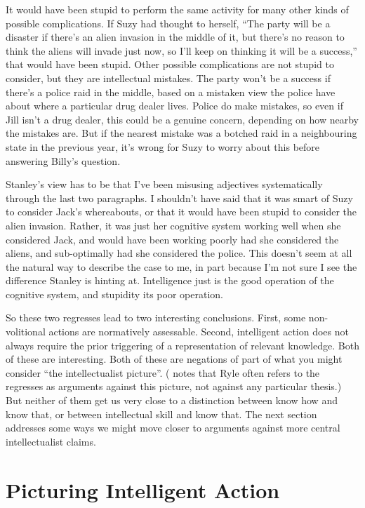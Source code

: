 It would have been stupid to perform the same activity for many other kinds of possible complications. If Suzy had thought to herself, ``The party will be a disaster if there's an alien invasion in the middle of it, but there's no reason to think the aliens will invade just now, so I'll keep on thinking it will be a success,'' that would have been stupid. Other possible complications are not stupid to consider, but they are intellectual mistakes. The party won't be a success if there's a police raid in the middle, based on a mistaken view the police have about where a particular drug dealer lives. Police do make mistakes, so even if Jill isn't a drug dealer, this could be a genuine concern, depending on how nearby the mistakes are. But if the nearest mistake was a botched raid in a neighbouring state in the previous year, it's wrong for Suzy to worry about this before answering Billy's question.

Stanley's view has to be that I've been misusing adjectives systematically through the last two paragraphs. I shouldn't have said that it was smart of Suzy to consider Jack's whereabouts, or that it would have been stupid to consider the alien invasion. Rather, it was just her cognitive system working well when she considered Jack, and would have been working poorly had she considered the aliens, and sub-optimally had she considered the police. This doesn't seem at all the natural way to describe the case to me, in part because I'm not sure I see the difference Stanley is hinting at. Intelligence just is the good operation of the cognitive system, and stupidity its poor operation.

So these two regresses lead to two interesting conclusions. First, some non-volition\-al actions are normatively assessable. Second, intelligent action does not always require the prior triggering of a representation of relevant knowledge. Both of these are interesting. Both of these are negations of part of what you might consider ``the intellectualist picture''. (\citet{Cath2013} notes that Ryle often refers to the regresses as arguments against this picture, not against any particular thesis.) But neither of them get us very close to a distinction between know how and know that, or between intellectual skill and know that. The next section addresses some ways we might move closer to arguments against more central intellectualist claims.

\section{Picturing Intelligent Action}

